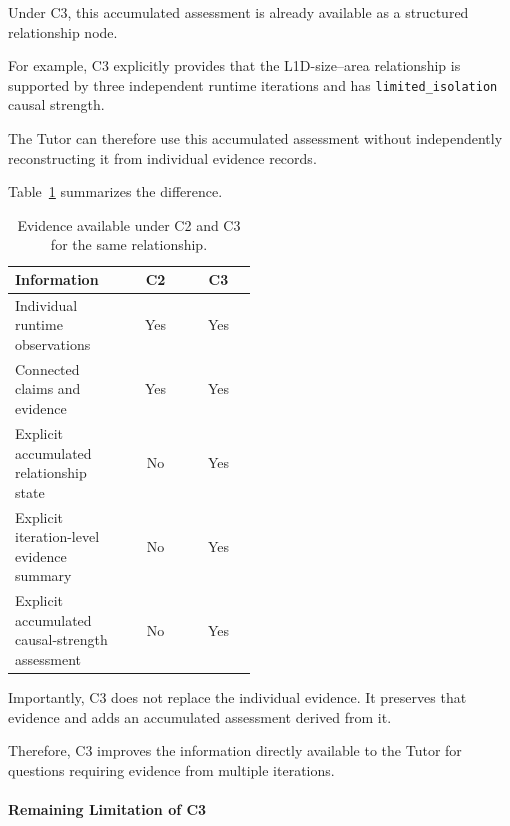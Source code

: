 Under C3, this accumulated
assessment is already available
as a structured relationship node.

For example, C3 explicitly
provides that the L1D-size--area
relationship is supported by
three independent runtime
iterations and has
\texttt{limited\_isolation}
causal strength.

The Tutor can therefore use
this accumulated assessment
without independently
reconstructing it from
individual evidence records.

Table~\ref{tab:app_p5_c2_c3_comparison}
summarizes the difference.

\begin{table}[htbp]
\centering
\caption{Evidence available under
C2 and C3 for the same relationship.}
\label{tab:app_p5_c2_c3_comparison}

\renewcommand{\arraystretch}{1.2}
\small
\setlength{\tabcolsep}{5pt}

\begin{tabular}{p{0.48\linewidth}cc}
\toprule
\textbf{Information} &
\textbf{C2} &
\textbf{C3} \\
\midrule

Individual runtime observations &
Yes & Yes \\

Connected claims and evidence &
Yes & Yes \\

Explicit accumulated relationship state &
No & Yes \\

Explicit iteration-level evidence summary &
No & Yes \\

Explicit accumulated causal-strength assessment &
No & Yes \\

\bottomrule
\end{tabular}
\end{table}

Importantly, C3 does not
replace the individual evidence.
It preserves that evidence
and adds an accumulated
assessment derived from it.

Therefore, C3 improves
the information directly
available to the Tutor
for questions requiring
evidence from multiple iterations.

\paragraph{Remaining Limitation of C3}

